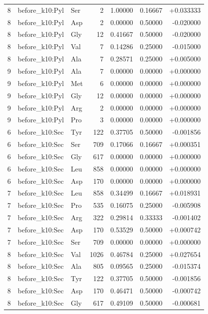 \begin{longtable}{r l l r r r r}
8 & before\_k10:Pyl & Ser & 2 & 1.00000 & 0.16667 & +0.033333 \\
8 & before\_k10:Pyl & Asp & 2 & 0.00000 & 0.50000 & -0.020000 \\
8 & before\_k10:Pyl & Gly & 12 & 0.41667 & 0.50000 & -0.020000 \\
8 & before\_k10:Pyl & Val & 7 & 0.14286 & 0.25000 & -0.015000 \\
8 & before\_k10:Pyl & Ala & 7 & 0.28571 & 0.25000 & +0.005000 \\
9 & before\_k10:Pyl & Ala & 7 & 0.00000 & 0.00000 & +0.000000 \\
9 & before\_k10:Pyl & Met & 6 & 0.00000 & 0.00000 & +0.000000 \\
9 & before\_k10:Pyl & Gly & 12 & 0.00000 & 0.00000 & +0.000000 \\
9 & before\_k10:Pyl & Arg & 2 & 0.00000 & 0.00000 & +0.000000 \\
9 & before\_k10:Pyl & Pro & 3 & 0.00000 & 0.00000 & +0.000000 \\
6 & before\_k10:Sec & Tyr & 122 & 0.37705 & 0.50000 & -0.001856 \\
6 & before\_k10:Sec & Ser & 709 & 0.17066 & 0.16667 & +0.000351 \\
6 & before\_k10:Sec & Gly & 617 & 0.00000 & 0.00000 & +0.000000 \\
6 & before\_k10:Sec & Leu & 858 & 0.00000 & 0.00000 & +0.000000 \\
6 & before\_k10:Sec & Asp & 170 & 0.00000 & 0.00000 & +0.000000 \\
7 & before\_k10:Sec & Leu & 858 & 0.34499 & 0.16667 & +0.018931 \\
7 & before\_k10:Sec & Pro & 535 & 0.16075 & 0.25000 & -0.005908 \\
7 & before\_k10:Sec & Arg & 322 & 0.29814 & 0.33333 & -0.001402 \\
7 & before\_k10:Sec & Asp & 170 & 0.53529 & 0.50000 & +0.000742 \\
7 & before\_k10:Sec & Ser & 709 & 0.00000 & 0.00000 & +0.000000 \\
8 & before\_k10:Sec & Val & 1026 & 0.46784 & 0.25000 & +0.027654 \\
8 & before\_k10:Sec & Ala & 805 & 0.09565 & 0.25000 & -0.015374 \\
8 & before\_k10:Sec & Tyr & 122 & 0.37705 & 0.50000 & -0.001856 \\
8 & before\_k10:Sec & Asp & 170 & 0.46471 & 0.50000 & -0.000742 \\
8 & before\_k10:Sec & Gly & 617 & 0.49109 & 0.50000 & -0.000681 \\

\end{longtable}
